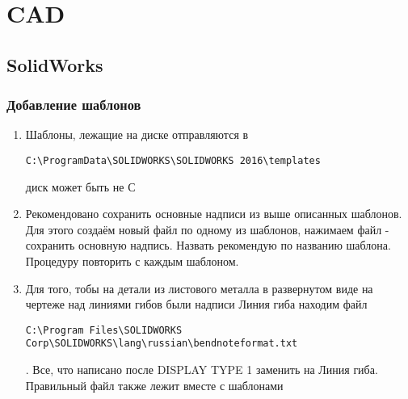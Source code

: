 \part[CAD]{CAD}
\chapter[SolidWorks]{SolidWorks}
\section[Добавление шаблонов]{Добавление шаблонов}
\begin{enumerate}
\item Шаблоны, лежащие на диске отправляются в \begin{verbatim}C:\ProgramData\SOLIDWORKS\SOLIDWORKS 2016\templates\end{verbatim} диск может быть не С
\item Рекомендовано сохранить основные надписи из выше описанных шаблонов. Для этого создаём новый файл по одному из шаблонов, нажимаем файл - сохранить основную надпись. Назвать рекомендую по названию шаблона. Процедуру повторить с каждым шаблоном.
\item Для того, тобы на детали из листового металла в развернутом виде на чертеже над линиями гибов были надписи Линия гиба находим файл \begin{verbatim}C:\Program Files\SOLIDWORKS Corp\SOLIDWORKS\lang\russian\bendnoteformat.txt\end{verbatim}. Все, что написано после DISPLAY TYPE 1 заменить на Линия гиба. Правильный файл также лежит вместе с шаблонами
\end{enumerate}